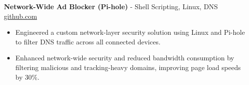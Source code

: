 \documentclass[11pt]{article}       %
\begin{document}
\textbf{Network-Wide Ad Blocker (Pi-hole)}{ - Shell Scripting, Linux, DNS} \hfill \href{https://github.com/Monica20030707}{github.com} \\
\vspace{-9pt}
\begin{itemize}
  \item Engineered a custom network-layer security solution using Linux and Pi-hole to filter DNS traffic across all connected devices.
  \item Enhanced network-wide security and reduced bandwidth consumption by filtering malicious and tracking-heavy domains, improving page load speeds by 30\%.
\end{itemize}

\end{document}
